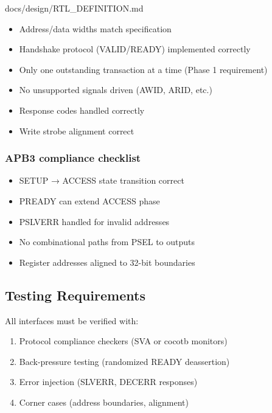 \begin{relocated}{docs/design/RTL_DEFINITION.md}
\begin{itemize}
\tightlist
\item[$\square$]
  Address/\allowbreak{}data widths match specification
\item[$\square$]
  Handshake protocol (VALID/\allowbreak{}READY) implemented correctly
\item[$\square$]
  Only one outstanding transaction at a time (Phase 1 requirement)
\item[$\square$]
  No unsupported signals driven (AWID, ARID, etc.)
\item[$\square$]
  Response codes handled correctly
\item[$\square$]
  Write strobe alignment correct
\end{itemize}

\subsubsection{APB3 compliance checklist}\label{ds:ch:rtl-definition:apb3-compliance-checklist}

\begin{itemize}
\tightlist
\item[$\square$]
  SETUP → ACCESS state transition correct
\item[$\square$]
  PREADY can extend ACCESS phase
\item[$\square$]
  PSLVERR handled for invalid addresses
\item[$\square$]
  No combinational paths from PSEL to outputs
\item[$\square$]
  Register addresses aligned to 32-bit boundaries
\end{itemize}

\subsection{Testing Requirements}\label{ds:ch:rtl-definition:testing-requirements}

All interfaces must be verified with:

\begin{enumerate}
\def\labelenumi{\arabic{enumi}.}
\tightlist
\item
  Protocol compliance checkers (SVA or cocotb monitors)
\item
  Back-pressure testing (randomized READY deassertion)
\item
  Error injection (SLVERR, DECERR responses)
\item
  Corner cases (address boundaries, alignment)
\end{enumerate}


\end{relocated}
